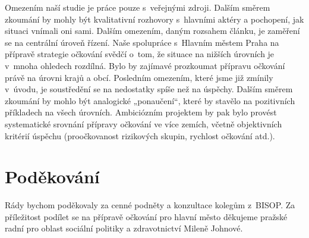 Omezením naší studie je práce pouze s~veřejnými zdroji. Dalším směrem zkoumání by mohly být kvalitativní rozhovory s~hlavními aktéry a pochopení, jak situaci vnímali oni sami. Dalším omezením, daným rozsahem článku, je zaměření se na centrální úroveň řízení. Naše spolupráce s~Hlavním městem Praha na přípravě strategie očkování \cite{hygienicka_stanice_praha_2021} svědčí o~tom, že situace na nižších úrovních je v~mnoha ohledech rozdílná. Bylo by zajímavé prozkoumat přípravu očkování právě na úrovni krajů a obcí. Posledním omezením, které jsme již zmínily v~úvodu, je soustředění se na nedostatky spíše než na úspěchy. Dalším směrem zkoumání by mohlo být analogické „ponaučení“, které by stavělo na pozitivních příkladech na všech úrovních. Ambiciózním projektem by pak bylo provést systematické srovnání přípravy očkování ve více zemích, včetně objektivních kritérií úspěchu (proočkovanost rizikových skupin, rychlost očkování atd.).

\section*{Poděkování}

Rády bychom poděkovaly za cenné podněty a konzultace kolegům z~BISOP.
Za příležitost podílet se na přípravě očkování pro hlavní město děkujeme pražské radní pro oblast sociální politiky a zdravotnictví Mileně Johnové.


